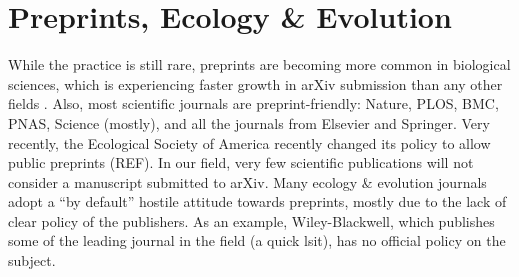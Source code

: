 \documentclass[letterpaper,twocolumn,superscriptaddress,showkeys]{revtex4}
\begin{document}


\section{Preprints, Ecology \& Evolution}

While the practice is still rare, preprints are becoming more common in
biological sciences, which is experiencing faster growth in arXiv submission
than any other fields \cite{cal12}. Also, most scientific journals are
preprint-friendly: Nature, PLOS, BMC, PNAS, Science (mostly), and all the
journals from Elsevier and Springer. Very recently, the Ecological Society of
America recently changed its policy to allow public preprints (REF). In our
field, very few scientific publications will not consider a manuscript
submitted to arXiv. Many ecology \& evolution journals adopt a ``by default''
hostile attitude towards preprints, mostly due to the lack of clear policy of
the publishers. As an example, Wiley-Blackwell, which publishes some of the
leading journal in the field (a quick lsit), has no official policy on the
subject.
\end{document}
